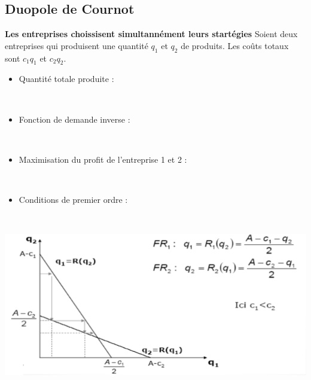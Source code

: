 \subsection{Duopole de Cournot}
\large{\textbf{Les entreprises choissisent simultannément leurs startégies}} \newline
\Large{Soient deux entreprises qui produisent une quantité $q_{1}$ et $q_{2}$ de produits. Les coûts totaux sont $c_{1}q_{1}$ et $c_{2}q_{2}$.} \newline
\begin{itemize}
    \item Quantité totale produite : \newline
    \textcolor{White}{.}
        \begin{center}
            \Large{}
        \end{center}
    \textcolor{White}{.}
    \item Fonction de demande inverse : \newline
    \textcolor{White}{.}
    \begin{center}
        \Large{}
    \end{center}
    \textcolor{White}{.}
    \item Maximisation du profit de l'entreprise 1 et 2 : \newline
    \textcolor{White}{.}
        \begin{center}
            \begin{itemize}
                \Large{} \newline
                \Large{}
            \end{itemize}
        \end{center}
    \textcolor{White}{.}
    \item Conditions de premier ordre : \newline
    \textcolor{White}{.}
    \begin{center}
            \begin{itemize}
                \Large{}
                \Large{}
            \end{itemize}
    \end{center}
    \textcolor{White}{.}
\end{itemize}
\includegraphics[scale=0.7]{Pics/Duopole_cournot.png}
\newpage
